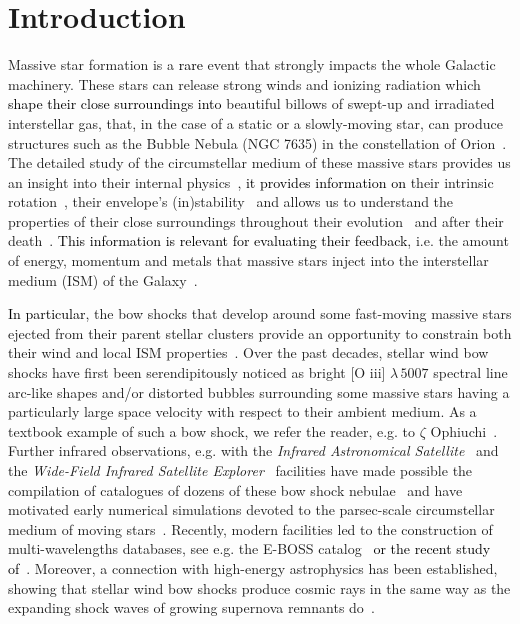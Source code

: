 \documentclass[useAMS,usenatbib]{mn2e}
\begin{document}
\section{Introduction}
\label{sect:introduction}


Massive star formation is a \textcolor{black}{rare} event that strongly impacts the whole
Galactic machinery. These stars can release strong winds and ionizing radiation
which \textcolor{black}{shape their close surroundings into} beautiful billows of swept-up and
irradiated interstellar gas, that, in the case of a static or a slowly-moving
star, can produce structures such as the Bubble Nebula (NGC 7635) in the
constellation of Orion~\citep{moore_aj_124_2002}. The detailed study of the
circumstellar medium of these massive stars provides us an insight into
their internal physics~\citep{langer_araa_50_2012}, \textcolor{black}{it provides information on} their
intrinsic rotation~\citep{langer_ApJ_520_1999}, their envelope's
(in)stability~\citep{yoon_apj_717_2012} and allows us to understand the
properties of their close surroundings throughout their 
evolution~\citep{vanmarle_aa_460_2006,chita_aa_488_2008} and after their 
death~\citep{orlando_apj_678_2008,chiotellis_aa_537_2012}. \textcolor{black}{This
information is relevant for evaluating their feedback}, i.e. the amount of energy,
momentum and metals that massive stars inject into the interstellar medium (ISM)
of the Galaxy~\citep{vink_asp_353_2006}. 


\textcolor{black}{In particular}, the bow shocks that develop around some fast-moving massive stars
ejected from their parent stellar clusters provide an  
opportunity to constrain both their wind and local ISM
properties~\citep{huthoff_aa_383_2002,meyer_mnras_439_2014}. Over the past decades,
stellar wind bow shocks have first been serendipitously noticed as bright [O{\sc
iii}] $\lambda \, 5007$ spectral line arc-like shapes and/or distorted
bubbles surrounding some massive stars having a particularly large space
velocity with respect to their ambient medium.
As a textbook example of such a bow shock, we refer the reader, e.g. 
to $\zeta$ Ophiuchi~\citep[][see Fig.~\ref{fig:obs} below]{gull_apj_230_1979}.
Further infrared observations, e.g. with the {\it Infrared Astronomical
Satellite}~\citep[{\it IRAS},][]{neugebauer_278_apj_1984} and 
the {\it Wide-Field Infrared Satellite Explorer}~\citep[ {\it WISE}, ][]{wright_aj_140_2010} facilities have made possible the compilation 
of catalogues of dozens of these bow shock nebulae~\citep{buren_apj_329_1988,vanburen_aj_110_1995,
noriegacrespo_aj_113_1997} and have motivated early numerical simulations
devoted to the parsec-scale circumstellar medium of moving
stars~\citep{brighenti_mnras_277_1995, brighenti_mnras_273_1995}. Recently,
modern facilities led to the construction of multi-wavelengths databases, see e.g.
the E-BOSS catalog~\citep{peri_aa_538_2012,2015arXiv150404264P} 
\textcolor{black}{ or the recent study of~\citet{kobulnicky_2016}}. Moreover, a
connection with high-energy astrophysics has been established, showing that
stellar wind bow shocks produce cosmic rays in the same way as the expanding shock waves of
growing supernova remnants do~\citep{valle_mnras_448_2015}. 
\end{document}
